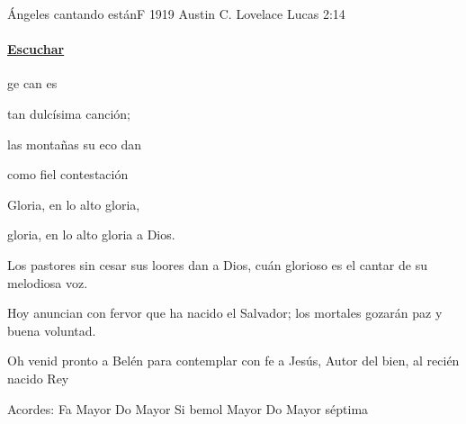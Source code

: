 \documentclass[12pt, spanish]{book}
\begin{document}
    \begin{song}{Ángeles cantando están}{F}
    {1919} %
    {Austin C. Lovelace}
    {Lucas 2:14} %
    {}
        \ifChordBk
            \paragraph{\mbox{}\hfill\protect\href{https://open.spotify.com/intl-es/track/1VffmS6ilKe0rQWctuVzpO}{Escuchar}\mbox{}\hfill}
        \fi

        \begin{SBOpGroup}
            ge can es

tan dulcísima canción;

las montañas su eco dan

como fiel contestación
        \end{SBOpGroup}

        \begin{SBChorus}
Gloria, en lo alto gloria,

gloria, en lo alto gloria a Dios.
        \end{SBChorus}

        \begin{SBOpGroup}
Los pastores sin cesar
sus loores dan a Dios,
cuán glorioso es el cantar
de su melodiosa voz.
        \end{SBOpGroup}

        \begin{SBOpGroup}
Hoy anuncian con fervor
que ha nacido el Salvador;
los mortales gozarán
paz y buena voluntad.
        \end{SBOpGroup}

        \begin{SBOpGroup}
Oh venid pronto a Belén
para contemplar con fe
a Jesús, Autor del bien,
al recién nacido Rey
        \end{SBOpGroup}

        \ifChordBk
        \begin{SBOpGroup}
            Acordes:
            \upchord{\F}\qquad Fa Mayor \hfill
            \upchord{\C}\qquad Do Mayor \hfill\null\break
            \upchord{\Bflat}\qquad Si bemol Mayor \hfill
            \upchord{\Cseven}\qquad Do Mayor s\'eptima \hfill\null\break
        \end{SBOpGroup}
        \fi
    \end{song}
\end{document}
